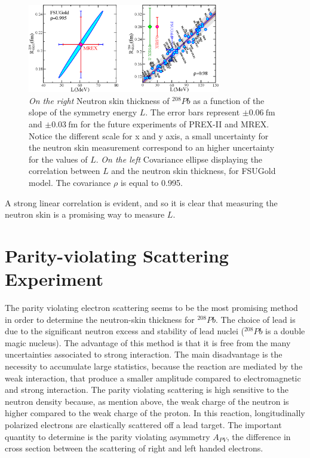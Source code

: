 \begin{figure}[hbtp]
 \centering
 \includegraphics[width=0.75\textwidth]{Introduzione/LvsR.pdf}
 \caption{\textit{On the right} Neutron skin thickness of $^{208}Pb$ as a function of the slope of the symmetry energy $L$. The error bars represent $\pm \SI{0.06}{\femto \meter}$ and $\pm \SI{0.03}{\femto \meter}$ for the future experiments of PREX-II and MREX. Notice the different scale for x and y axis, a small uncertainty for the neutron skin measurement correspond to an higher uncertainty for the values of $L$. \textit{On the left} Covariance ellipse displaying the correlation between $L$ and the neutron skin thickness, for FSUGold model. The covariance $\rho$ is equal to 0.995.}
 \label{fig:LvsR}
 \end{figure}
 
A strong linear correlation is evident, and so it is clear that measuring the neutron skin is a promising way to measure $L$. 


  
\section{Parity-violating Scattering Experiment}

The parity violating electron scattering seems to be the most promising method in order to determine the neutron-skin thickness for $^{208}Pb$. The choice of lead is due to the significant neutron excess and stability of lead nuclei ($^{208}Pb$ is a double magic nucleus). The advantage of this method is that it is free from the many uncertainties associated to strong interaction. The main disadvantage is the necessity to accumulate large statistics, because the reaction are mediated by the weak interaction, that produce a smaller amplitude compared to electromagnetic and strong interaction. 
The parity violating scattering is high sensitive to the neutron density because, as mention above, the weak charge of the neutron is higher compared to the weak charge of the proton.
In this reaction, longitudinally polarized electrons are elastically scattered off a lead target. The important quantity to determine is the parity violating asymmetry $A_{PV}$, the difference in cross section between the scattering of right and left handed electrons. 

